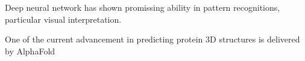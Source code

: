 Deep neural network has shown promissing ability in pattern recognitions, particular visual interpretation.
\par 

One of the current advancement in predicting protein 3D structures is delivered by AlphaFold